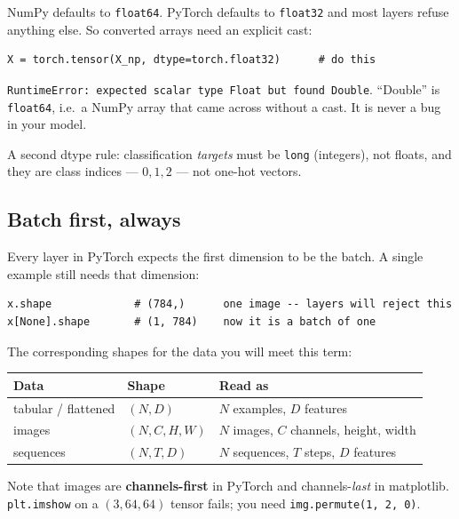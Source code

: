 \documentclass[11pt]{article}
\begin{document}
NumPy defaults to \texttt{float64}. PyTorch defaults to \texttt{float32} and
most layers refuse anything else. So converted arrays need an explicit cast:

\begin{lstlisting}
X = torch.tensor(X_np, dtype=torch.float32)      # do this
\end{lstlisting}

\begin{keybox}
\texttt{RuntimeError: expected scalar type Float but found Double}. ``Double''
is \texttt{float64}, i.e.\ a NumPy array that came across without a cast. It is
never a bug in your model.
\end{keybox}

A second dtype rule: classification \emph{targets} must be \texttt{long}
(integers), not floats, and they are class indices --- $0,1,2$ --- not one-hot
vectors.

\subsection{Batch first, always}

Every layer in PyTorch expects the first dimension to be the batch. A single
example still needs that dimension:

\begin{lstlisting}
x.shape             # (784,)      one image -- layers will reject this
x[None].shape       # (1, 784)    now it is a batch of one
\end{lstlisting}

The corresponding shapes for the data you will meet this term:

\begin{center}
\begin{tabular}{@{}lll@{}}
\toprule
Data & Shape & Read as \\
\midrule
tabular / flattened & $(N, D)$ & $N$ examples, $D$ features \\
images & $(N, C, H, W)$ & $N$ images, $C$ channels, height, width \\
sequences & $(N, T, D)$ & $N$ sequences, $T$ steps, $D$ features \\
\bottomrule
\end{tabular}
\end{center}

Note that images are \textbf{channels-first} in PyTorch and channels-\emph{last}
in matplotlib. \texttt{plt.imshow} on a $(3, 64, 64)$ tensor fails; you need
\texttt{img.permute(1, 2, 0)}.
\end{document}
